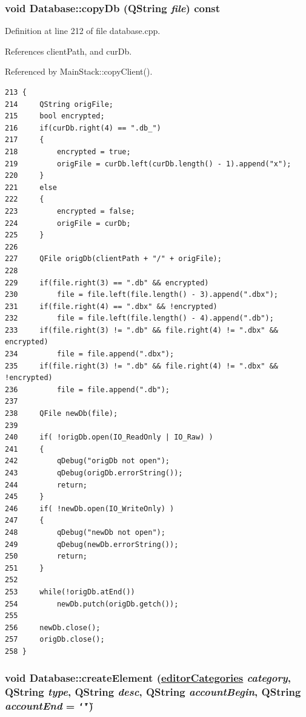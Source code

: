 \hypertarget{classDatabase_a4}{
\subsubsection[copyDb]{\setlength{\rightskip}{0pt plus 5cm}void Database::copy\-Db (QString {\em file}) const}}
\label{classDatabase_a4}


Definition at line 212 of file database.cpp.

References client\-Path, and cur\-Db.

Referenced by Main\-Stack::copy\-Client().

\footnotesize\begin{verbatim}213 {
214     QString origFile;
215     bool encrypted;
216     if(curDb.right(4) == ".db_")
217     {
218         encrypted = true;
219         origFile = curDb.left(curDb.length() - 1).append("x");
220     }
221     else
222     {
223         encrypted = false;
224         origFile = curDb;
225     }
226 
227     QFile origDb(clientPath + "/" + origFile);
228 
229     if(file.right(3) == ".db" && encrypted)
230         file = file.left(file.length() - 3).append(".dbx");
231     if(file.right(4) == ".dbx" && !encrypted)
232         file = file.left(file.length() - 4).append(".db");
233     if(file.right(3) != ".db" && file.right(4) != ".dbx" && encrypted)
234         file = file.append(".dbx");
235     if(file.right(3) != ".db" && file.right(4) != ".dbx" && !encrypted)
236         file = file.append(".db");
237 
238     QFile newDb(file);
239     
240     if( !origDb.open(IO_ReadOnly | IO_Raw) )
241     {
242         qDebug("origDb not open");
243         qDebug(origDb.errorString());
244         return;
245     }
246     if( !newDb.open(IO_WriteOnly) )
247     {
248         qDebug("newDb not open");
249         qDebug(newDb.errorString());
250         return;
251     }
252     
253     while(!origDb.atEnd())
254         newDb.putch(origDb.getch());
255     
256     newDb.close();
257     origDb.close();
258 }
\end{verbatim}\normalsize 


\hypertarget{classDatabase_a19}{
\subsubsection[createElement]{\setlength{\rightskip}{0pt plus 5cm}void Database::create\-Element (\hyperlink{classDatabase_w8}{editor\-Categories} {\em category}, QString {\em type}, QString {\em desc}, QString {\em account\-Begin}, QString {\em account\-End} = {\tt \char`\"{}\char`\"{}})}}
\label{classDatabase_a19}


